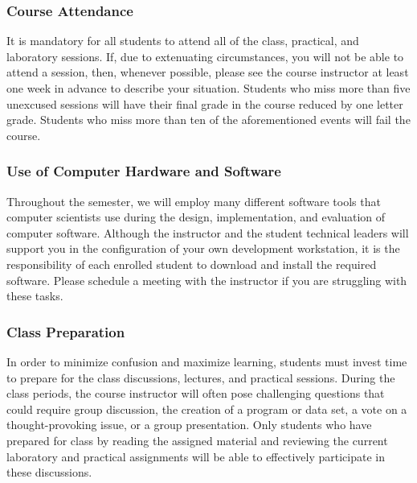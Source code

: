 \documentclass[11pt]{article}
\begin{document}
\vspace*{-.1in}

\subsubsection*{Course Attendance}

It is mandatory for all students to attend all of the class, practical, and
laboratory sessions. If, due to extenuating circumstances, you will not be able
to attend a session, then, whenever possible, please see the course instructor
at least one week in advance to describe your situation. Students who miss more
than five unexcused sessions will have their final grade in the course reduced
by one letter grade. Students who miss more than ten of the aforementioned
events will fail the course.

\vspace*{-.05in}

\subsubsection*{Use of Computer Hardware and Software}

Throughout the semester, we will employ many different software tools that
computer scientists use during the design, implementation, and evaluation of
computer software. Although the instructor and the student technical leaders
will support you in the configuration of your own development workstation, it is
the responsibility of each enrolled student to download and install the required
software. Please schedule a meeting with the instructor if you are struggling
with these tasks.

\vspace*{-.1in}

\subsubsection*{Class Preparation}

In order to minimize confusion and maximize learning, students must invest time
to prepare for the class discussions, lectures, and practical sessions. During
the class periods, the course instructor will often pose challenging questions
that could require group discussion, the creation of a program or data set, a
vote on a thought-provoking issue, or a group presentation. Only students who
have prepared for class by reading the assigned material and reviewing the
current laboratory and practical assignments will be able to effectively
participate in these discussions.
\end{document}
